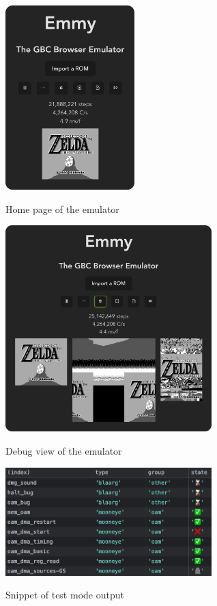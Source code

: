 \documentclass[11pt]{report}
\begin{document}
\begin{figure}[h]
    \centering
    \includegraphics[width=5cm]{images/emmy-home-page.png}\\
    \caption{Home page of the emulator}
    \label{fig:emmy-home}
\end{figure}

\begin{figure}[h]
    \centering
    \includegraphics[width=8cm]{images/emmy-debug-view.png}\\
    \caption{Debug view of the emulator}
    \label{fig:emmy-debug-view}
\end{figure}

\begin{figure}[h]
    \centering
    \includegraphics[width=8cm]{images/emmy-test-output.png}\\
    \caption{Snippet of test mode output}
    \label{fig:emmy-test-output}
\end{figure}
\end{document}
